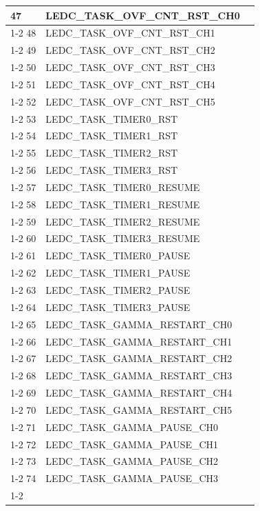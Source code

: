 \documentclass[main\_\_EN.tex]{subfiles}
\begin{document}
\begin{longtable}{ | l | l | l | }
47  & LEDC\_TASK\_OVF\_CNT\_RST\_CH0& \\ \cline{1-2}
48  & LEDC\_TASK\_OVF\_CNT\_RST\_CH1& \\ \cline{1-2}
49  & LEDC\_TASK\_OVF\_CNT\_RST\_CH2& \\ \cline{1-2}
50  & LEDC\_TASK\_OVF\_CNT\_RST\_CH3& \\ \cline{1-2}
51  & LEDC\_TASK\_OVF\_CNT\_RST\_CH4& \\ \cline{1-2}
52  & LEDC\_TASK\_OVF\_CNT\_RST\_CH5& \\ \cline{1-2}
53  & LEDC\_TASK\_TIMER0\_RST  & \\ \cline{1-2}
54  & LEDC\_TASK\_TIMER1\_RST  & \\ \cline{1-2}
55  & LEDC\_TASK\_TIMER2\_RST  & \\ \cline{1-2}
56  & LEDC\_TASK\_TIMER3\_RST  & \\ \cline{1-2}
57  & LEDC\_TASK\_TIMER0\_RESUME    & \\ \cline{1-2}
58  & LEDC\_TASK\_TIMER1\_RESUME    & \\ \cline{1-2}
59  & LEDC\_TASK\_TIMER2\_RESUME    & \\ \cline{1-2}
60  & LEDC\_TASK\_TIMER3\_RESUME    & \\ \cline{1-2}
61  & LEDC\_TASK\_TIMER0\_PAUSE& \\ \cline{1-2}
62  & LEDC\_TASK\_TIMER1\_PAUSE& \\ \cline{1-2}
63  & LEDC\_TASK\_TIMER2\_PAUSE& \\ \cline{1-2}
64  & LEDC\_TASK\_TIMER3\_PAUSE& \\ \cline{1-2}
65  & LEDC\_TASK\_GAMMA\_RESTART\_CH0      & \\ \cline{1-2}
66  & LEDC\_TASK\_GAMMA\_RESTART\_CH1      & \\ \cline{1-2}
67  & LEDC\_TASK\_GAMMA\_RESTART\_CH2      & \\ \cline{1-2}
68  & LEDC\_TASK\_GAMMA\_RESTART\_CH3      & \\ \cline{1-2}
69  & LEDC\_TASK\_GAMMA\_RESTART\_CH4      & \\ \cline{1-2}
70  & LEDC\_TASK\_GAMMA\_RESTART\_CH5      & \\ \cline{1-2}
71  & LEDC\_TASK\_GAMMA\_PAUSE\_CH0 & \\ \cline{1-2}
72  & LEDC\_TASK\_GAMMA\_PAUSE\_CH1 & \\ \cline{1-2}
73  & LEDC\_TASK\_GAMMA\_PAUSE\_CH2 & \\ \cline{1-2}
74  & LEDC\_TASK\_GAMMA\_PAUSE\_CH3 & \\ \cline{1-2}

\end{longtable}
\end{document}
